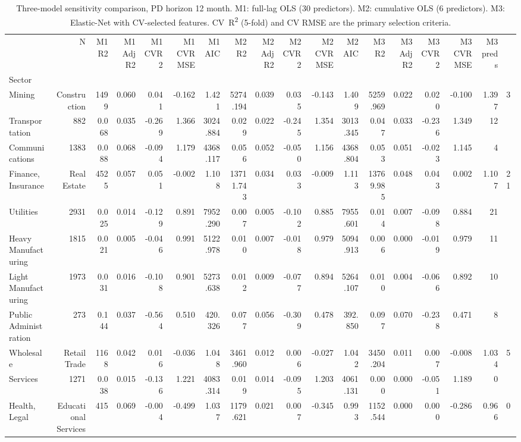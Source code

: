 \begin{table}[htbp]
\caption{Three-model sensitivity comparison, PD horizon 12 month. M1: full-lag OLS (30 predictors). M2: cumulative OLS (6 predictors). M3: Elastic-Net with CV-selected features. CV~R\textsuperscript{2} (5-fold) and CV RMSE are the primary selection criteria.}
\label{tab:model_comparison}
\begin{tabular}{lrrrrrrrrrrrrrrrr}
\toprule
 & N & M1 R2 & M1 AdjR2 & M1 CVR2 & M1 CVRMSE & M1 AIC & M2 R2 & M2 AdjR2 & M2 CVR2 & M2 CVRMSE & M2 AIC & M3 R2 & M3 AdjR2 & M3 CVR2 & M3 CVRMSE & M3 preds \\
Sector &  &  &  &  &  &  &  &  &  &  &  &  &  &  &  &  \\
\midrule
Mining & Construction & 1499 & 0.060 & 0.041 & -0.162 & 1.421 & 5274.194 & 0.039 & 0.035 & -0.143 & 1.409 & 5259.969 & 0.022 & 0.020 & -0.100 & 1.397 & 3 \\
Transportation & 882 & 0.068 & 0.035 & -0.269 & 1.366 & 3024.884 & 0.029 & 0.022 & -0.245 & 1.354 & 3013.345 & 0.047 & 0.033 & -0.236 & 1.349 & 12 \\
Communications & 1383 & 0.088 & 0.068 & -0.094 & 1.179 & 4368.117 & 0.056 & 0.052 & -0.050 & 1.156 & 4368.804 & 0.053 & 0.051 & -0.023 & 1.145 & 4 \\
Finance, Insurance & Real Estate & 4525 & 0.057 & 0.051 & -0.002 & 1.108 & 13711.743 & 0.034 & 0.033 & -0.009 & 1.113 & 13769.985 & 0.048 & 0.043 & 0.002 & 1.107 & 21 \\
Utilities & 2931 & 0.025 & 0.014 & -0.129 & 0.891 & 7952.290 & 0.007 & 0.005 & -0.102 & 0.885 & 7955.601 & 0.014 & 0.007 & -0.098 & 0.884 & 21 \\
Heavy Manufacturing & 1815 & 0.021 & 0.005 & -0.046 & 0.991 & 5122.978 & 0.010 & 0.007 & -0.018 & 0.979 & 5094.913 & 0.006 & 0.000 & -0.019 & 0.979 & 11 \\
Light Manufacturing & 1973 & 0.031 & 0.016 & -0.108 & 0.901 & 5273.638 & 0.012 & 0.009 & -0.077 & 0.894 & 5264.107 & 0.010 & 0.004 & -0.066 & 0.892 & 10 \\
Public Administration & 273 & 0.144 & 0.037 & -0.564 & 0.510 & 420.326 & 0.077 & 0.056 & -0.309 & 0.478 & 392.850 & 0.097 & 0.070 & -0.238 & 0.471 & 8 \\
Wholesale & Retail Trade & 1168 & 0.042 & 0.016 & -0.036 & 1.048 & 3461.960 & 0.012 & 0.006 & -0.027 & 1.042 & 3450.204 & 0.011 & 0.007 & -0.008 & 1.034 & 5 \\
Services & 1271 & 0.038 & 0.015 & -0.136 & 1.221 & 4083.314 & 0.019 & 0.014 & -0.095 & 1.203 & 4061.131 & 0.000 & 0.000 & -0.051 & 1.189 & 0 \\
Health, Legal & Educational Services & 415 & 0.069 & -0.004 & -0.499 & 1.037 & 1179.621 & 0.021 & 0.007 & -0.345 & 0.993 & 1152.544 & 0.000 & 0.000 & -0.286 & 0.966 & 0 \\
\bottomrule
\end{tabular}
\end{table}
